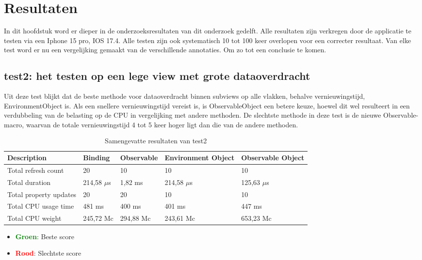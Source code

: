 \chapter{Resultaten}%
\label{ch:resultaten}
In dit hoofdstuk word er dieper in de onderzoeksresultaten van dit onderzoek gedelft. Alle resultaten zijn verkregen door de applicatie te testen via een Iphone 15 pro, IOS 17.4. Alle testen zijn ook systematisch 10 tot 100 keer overlopen voor een correcter resultaat. Van elke test word er nu een vergelijking gemaakt van de verschillende annotaties. Om zo tot een conclusie te komen.

\section{test2: het testen op een lege view met grote dataoverdracht}
Uit deze test blijkt dat de beste methode voor dataoverdracht binnen subviews op alle vlakken, behalve vernieuwingstijd, EnvironmentObject is. Als een snellere vernieuwingstijd vereist is, is ObservableObject een betere keuze, hoewel dit wel resulteert in een verdubbeling van de belasting op de CPU in vergelijking met andere methoden. De slechtste methode in deze test is de nieuwe Observable-macro, waarvan de totale vernieuwingstijd 4 tot 5 keer hoger ligt dan die van de andere methoden. 
\begin{table}[H]
    \centering
    
    \begin{tabularx}{\textwidth}{|>{\raggedright\arraybackslash}m{5cm}|X|X|X|X|}
        \hline
        \textbf{Description} & \textbf{Binding} & \textbf{Observable} & \textbf{Environment Object} & \textbf{Observable Object} \\ 
        \hline
        Total refresh count & \cellcolor{red!50}20 & \cellcolor{green!50}10 & \cellcolor{green!50}10 & \cellcolor{green!50}10 \\ 
        \hline
        Total duration & 214,58 \(\mu\)s & \cellcolor{red!50}1,82 ms & 214,58 \(\mu\)s & \cellcolor{green!50}125,63 \(\mu\)s \\ 
        \hline
        Total property updates & \cellcolor{red!50}20 & \cellcolor{red!50}20 & \cellcolor{green!50}10 & \cellcolor{green!50}10 \\ 
        \hline
        Total CPU usage time & \cellcolor{red!50}481 ms & \cellcolor{green!50}400 ms & \cellcolor{green!50}401 ms & 447 ms \\ 
        \hline
        Total CPU weight & \cellcolor{green!50}245,72 Mc & 294,88 Mc & \cellcolor{green!50}243,61 Mc & \cellcolor{red!50}653,23 Mc \\ 
        \hline
    \end{tabularx}
    \caption{Samengevatte resultaten van test2}
    \label{table:summary1}
\end{table}
\begin{itemize}
    \item \textcolor{green}{\textbf{Groen}}: Beste score
    \item \textcolor{red}{\textbf{Rood}}: Slechtste score
\end{itemize}

